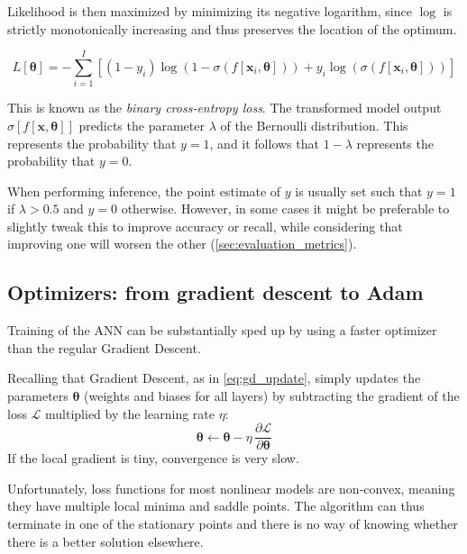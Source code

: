 Likelihood is then maximized by minimizing its negative logarithm, since $\log$ is strictly monotonically increasing and thus preserves the location of the optimum.

\begin{equation}
    L[\boldsymbol{\theta}] =
    -\sum_{i=1}^{I} \left[(1-y_i)\log\left(1 - \sigma(f[\mathbf{x}_i,
    \boldsymbol{\theta}])\right) + y_i \log\left(\sigma(f[\mathbf{x}_i,
    \boldsymbol{\theta}])\right)\right]
\end{equation}

This is known as the \textit{binary cross-entropy loss}. The transformed model output $\sigma[f[\mathbf{x}, \boldsymbol{\theta}]]$ predicts the parameter $\lambda$ of the Bernoulli distribution. This represents the probability that $y = 1$, and it follows that $1 - \lambda$ represents the probability that $y = 0$.

When performing inference, the point estimate of $y$ is usually set such that $y = 1$ if $\lambda > 0.5$ and $y = 0$ otherwise.
However, in some cases it might be preferable to slightly tweak this to improve accuracy or recall, while considering that improving one will worsen the other (\cref{sec:evaluation_metrics}).


\subsection{Optimizers: from gradient descent to Adam}
\label{subsec:adam}

Training of the ANN can be substantially sped up by using a faster optimizer than the regular Gradient Descent.

Recalling that Gradient Descent, as in \cref{eq:gd_update}, simply updates the parameters $\boldsymbol{\theta}$ (weights and biases for all layers) by subtracting the gradient of the loss $\mathcal{L}$ multiplied by the learning rate $\eta$:
\begin{equation*}
    \boldsymbol{\theta} \leftarrow \boldsymbol{\theta} - \eta \, \frac{\partial \mathcal{L}}{\partial \boldsymbol{\theta}}
\end{equation*}
If the local gradient is tiny, convergence is very slow.

Unfortunately, loss functions for most nonlinear models are non-convex, meaning they have multiple local minima and saddle points. The algorithm can thus terminate in one
of the stationary points and there is no way of knowing whether there is a better solution elsewhere.

